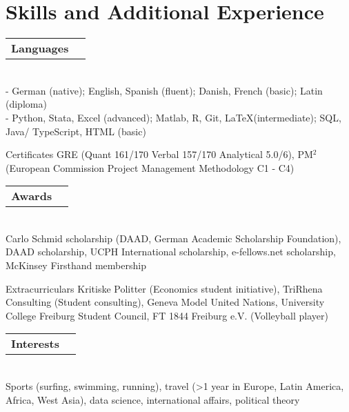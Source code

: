 \documentclass[A4,11pt]{article}
\makeatletter
\newcommand{\Subheading}[5]{   
    \begin{tabular*}{0.97\textwidth}[t]{l@{\extracolsep{\fill}}r}
      \textbf{#1}\textit{\small #2} & \small #3 
      \end{tabular*} \\
      \small #4 \\
    \vspace{7pt}
    }
\makeatother
\begin{document}





\section{Skills and Additional Experience}

    \Subheading
    {Languages}{}{}
    {- German (native); 
    English, 
    Spanish (fluent); 
    Danish, French (basic); 
    Latin (diploma)\\
    - Python, Stata, Excel (advanced); 
    Matlab, R, Git, \LaTeX\space(intermediate); 
    SQL, Java/ TypeScript, HTML (basic)}
    
    \Subheading
    {Certificates}{}{}
    {GRE (Quant 161/170 Verbal 157/170 Analytical 5.0/6),  
    PM$^2$ (European Commission Project Management Methodology C1 - C4)}
    
    \Subheading
    {Awards}{}{}
    {Carlo Schmid scholarship (DAAD, German Academic Scholarship Foundation), 
    DAAD scholarship, 
    UCPH International scholarship, 
    e-fellows.net scholarship, 
    McKinsey Firsthand membership} 

    \Subheading
    {Extracurriculars}{}{}
    {Kritiske Politter (Economics student initiative), TriRhena Consulting (Student consulting), Geneva Model United Nations, University College Freiburg Student Council, FT 1844 Freiburg e.V. (Volleyball player)}{}

    \Subheading
    {Interests}{}{}
    {Sports (surfing, swimming, running), travel (>1 year in Europe, Latin America, Africa, West Asia), data science, international affairs, political theory}

\vfill
{}
\end{document}

